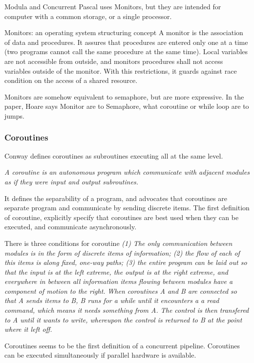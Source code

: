 Modula and Concurrent Pascal uses Monitors, but they are intended for computer with a common storage, or a single processor.


Monitors: an operating system structuring concept \cite{Hoare1974}
A monitor is the association of data and procedures.
It assures that procedures are entered only one at a time (two programs cannot call the same procedure at the same time).
Local variables are not accessible from outside, and monitors procedures shall not access variables outside of the monitor.
With this restrictions, it guards against race condition on the access of a shared resource.

Monitors are somehow equivalent to semaphore, but are more expressive.
In the paper, Hoare says Monitor are to Semaphore, what coroutine or while loop are to jumps.


\subsubsection{Coroutines}

Conway defines coroutines as subroutines executing all at the same level.\cite{Conway1963}

\textit{A coroutine is an autonomous program which communicate with adjacent modules as if they were input and output subroutines.}

It defines the separability of a program, and advocates that coroutines are separate program and communicate by sending discrete items.
The first definition of coroutine, explicitly specify that coroutines are best used when they can be executed, and communicate asynchronously.

There is three conditions for coroutine
\textit{(1) The only communication between modules is in the form of discrete items of information; (2) the flow of each of this items is along fixed, one-way paths; (3) the entire program can be laid out so that the input is at the left extreme, the output is at the right extreme, and everywhere in between all information items flowing between modules have a component of motion to the right.}
\textit{When coroutines A and B are connected so that A sends items to B, B runs for a while until it encounters a a read command, which means it needs something from A. The control is then transfered to A until it wants to write, whereupon the control is returned to B at the point where it left off.}

Coroutines seems to be the first definition of a concurrent pipeline.
Coroutines can be executed simultaneously if parallel hardware is available.

